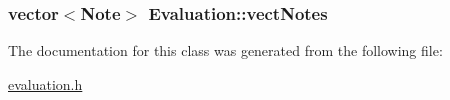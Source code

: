 \hypertarget{class_evaluation_ac3f2543471f61f13fdaab768960f31fc}{
\subsubsection[{vect\+Notes}]{\setlength{\rightskip}{0pt plus 5cm}vector$<${\bf Note}$>$ Evaluation\+::vect\+Notes\hspace{0.3cm}{\ttfamily [private]}}}\label{class_evaluation_ac3f2543471f61f13fdaab768960f31fc}


The documentation for this class was generated from the following file\+:\begin{DoxyCompactItemize}
\item 
\hyperlink{evaluation_8h}{evaluation.\+h}\end{DoxyCompactItemize}
